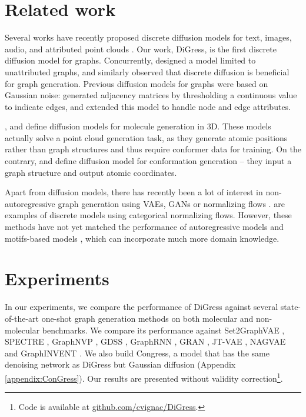 \documentclass{article} %
\theoremstyle{plain}
\theoremstyle{definition}
\theoremstyle{remark}
\begin{document}
\section{Related work}
Several works have recently proposed discrete diffusion models for text, images, audio, and attributed point clouds \citep{austin2021structured, yang2022diffsound, luo2022antigen}.
Our work, DiGress, is the first discrete diffusion model for graphs. Concurrently,  \citet{haefeli2022diffusion} designed a model limited to unattributed graphs, and similarly observed that discrete diffusion is beneficial for graph generation. Previous diffusion models for graphs were based on Gaussian noise: \citet{niu2020permutation} generated adjacency matrices by thresholding a continuous value to indicate edges, and \citet{jo2022score} extended this model to handle node and edge attributes. 

\citet{trippe2022diffusion}, \citet{hoogeboom2022equivariant} and \citet{wu2022score} define diffusion models for molecule generation in 3D. These models actually solve a point cloud generation task, as they generate atomic positions rather than graph structures and thus require conformer data for training.
On the contrary, \citet{xu2022geodiff} and \citet{jing2022torsional} define diffusion model for conformation generation -- they input a graph structure and output atomic coordinates.

Apart from diffusion models, there has recently been a lot of interest in non-autoregressive graph generation using VAEs, GANs or normalizing flows \citep{zhu2022survey}. \citep{madhawa2019graphnvp, lippe2020categorical, luo2021graphdf} are examples of discrete models using categorical normalizing flows.
However, these methods have not yet matched the performance of autoregressive models \citep{liu2018constrained, liao2019efficient, mercado2021graph} and motifs-based models \citep{jin2020hierarchical, maziarz2021learning}, which can incorporate much more domain knowledge.

\section{Experiments}
In our experiments, we compare the performance of DiGress against several state-of-the-art one-shot graph generation methods on both molecular and non-molecular benchmarks.
We compare its performance against Set2GraphVAE \citep{vignac2021top}, SPECTRE \citep{martinkus2022spectre}, GraphNVP \citep{madhawa2019graphnvp}, GDSS \citep{jo2022score}, GraphRNN \citep{you2018graphrnn}, GRAN \citep{liao2019efficient}, JT-VAE \citep{jin2018junction}, NAGVAE \citep{kwon2020compressed} and GraphINVENT \citep{mercado2021graph}. We also build Congress, a model that has the same denoising network as DiGress but Gaussian diffusion (Appendix \ref{appendix:ConGress}). Our results are presented without validity correction\footnote{Code is available at \url{github.com/cvignac/DiGress}.}.
\end{document}
